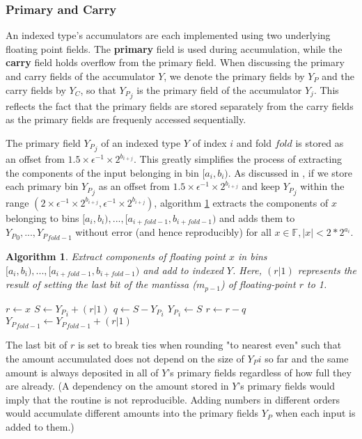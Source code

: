 \documentclass[12pt]{article}
\providecommand{\F}{\ensuremath{\mathbb{F}}}
\theoremstyle{plain}
\newtheorem{alg}{Algorithm}[section]
\begin{document}
    \subsubsection{Primary and Carry}
      An indexed type's accumulators are each implemented using two underlying floating point fields. The \textbf{primary} field is used during accumulation, while the \textbf{carry} field holds overflow from the primary field. When discussing the primary and carry fields of the accumulator $Y$, we denote the primary fields by $Y_P$ and the carry fields by $Y_C$, so that ${Y_P}_j$ is the primary field of the accumulator $Y_j$. This reflects the fact that the primary fields are stored separately from the carry fields as the primary fields are frequenly accessed sequentially.

      The primary field ${Y_P}_j$ of an indexed type $Y$ of index $i$ and fold $fold$ is stored as an offset from $1.5\times \epsilon^{-1} \times 2^{b_{i + j}}$. This greatly simplifies the process of extracting the components of the input belonging in bin $[a_i, b_i)$.
      As discussed in \cite{repsum}, if we store each primary bin ${Y_P}_j$ as an offset from $1.5 \times \epsilon^{-1} \times 2^{b_{i + j}}$ and keep ${Y_P}_j$ within the range $(2 \times \epsilon^{-1} \times 2^{b_{i + j}}, \epsilon^{-1} \times 2^{b_{i + j}})$, algorithm \ref{alg:deposit} extracts the components of $x$ belonging to bins $[a_i, b_i), ..., [a_{i + fold - 1}, b_{i + fold - 1})$ and adds them to ${Y_P}_0, ..., {Y_P}_{fold - 1}$ without error (and hence reproducibly) for all $x \in \F, |x| < 2 * 2^{a_i}$.
      \begin{alg}
        Extract components of floating point $x$ in bins $[a_i, b_i), ..., [a_{i + fold - 1}, b_{i + fold - 1})$ and add to indexed $Y$. Here, $(r | 1)$ represents the result of setting the last bit of the mantissa ($m_{p - 1}$) of floating-point $r$ to 1.
        \begin{algorithmic}
            \State $r \gets x$
              \State $S \gets {Y_P}_i + (r | 1)$
              \State $q \gets S - {Y_P}_i$
              \State ${Y_P}_i \gets S$
              \State $r \gets r - q$
            \EndFor
            \State ${Y_P}_{fold - 1} \gets {Y_P}_{fold - 1} + (r | 1)$
          \EndFunction
        \end{algorithmic}
        \label{alg:deposit}
      \end{alg}
      The last bit of $r$ is set to break ties when rounding "to nearest even" such that the amount accumulated does not depend on the size of ${Y_P}i$ so far and the same amount is always deposited in all of $Y$'s primary fields regardless of how full they are already. (A dependency on the amount stored in $Y$'s primary fields would imply that the routine is not reproducible. Adding numbers in different orders would accumulate different amounts into the primary fields $Y_P$ when each input is added to them.)
\end{document}
